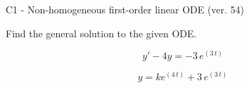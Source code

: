 \begin{exercise}
  \begin{exerciseTitle}C1 - Non-homogeneous first-order linear ODE (ver. 54)\end{exerciseTitle}
  \begin{exerciseStatement}
    
Find the general solution to the given ODE.

    
\[y'-4y= -3 \, e^{\left(3 \, t\right)}\]

  \end{exerciseStatement}
  \begin{exerciseAnswer}
    
\[y= k e^{\left(4 \, t\right)} + 3 \, e^{\left(3 \, t\right)}\]

  \end{exerciseAnswer}
\end{exercise}